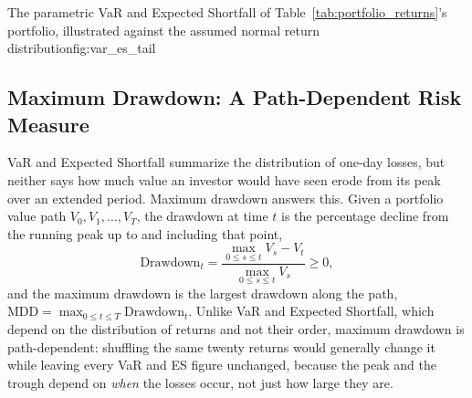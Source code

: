 \documentclass[../ai_in_finance]{subfiles}
\begin{document}
\begin{bookfigure}[htbp]{The parametric VaR and Expected Shortfall of Table~\ref{tab:portfolio_returns}'s portfolio, illustrated against the assumed normal return distribution}{fig:var_es_tail}
\end{bookfigure}

\subsection{Maximum Drawdown: A Path-Dependent Risk Measure}
\label{sec:max-drawdown}

VaR and Expected Shortfall summarize the distribution of one-day losses, but neither says how much value an investor would have seen erode from its peak over an extended period. Maximum drawdown answers this. Given a portfolio value path $V_0, V_1, \ldots, V_T$, the drawdown at time $t$ is the percentage decline from the running peak up to and including that point,
\begin{equation*}
\text{Drawdown}_t = \frac{\max_{0 \le s \le t} V_s - V_t}{\max_{0 \le s \le t} V_s} \ge 0,
\end{equation*}
and the maximum drawdown is the largest drawdown along the path, $\text{MDD} = \max_{0\le t \le T} \text{Drawdown}_t$. Unlike VaR and Expected Shortfall, which depend on the distribution of returns and not their order, maximum drawdown is path-dependent: shuffling the same twenty returns would generally change it while leaving every VaR and ES figure unchanged, because the peak and the trough depend on \emph{when} the losses occur, not just how large they are.
\end{document}
